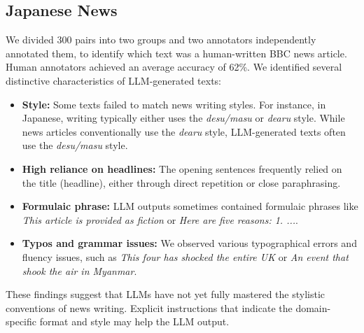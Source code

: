 \subsection{Japanese News}
\label{japanese_news_distinctive_clues}
We divided 300 pairs into two groups and two annotators independently annotated them, to identify which text was a human-written BBC news article.
Human annotators achieved an average accuracy of 62\%. %
We identified several distinctive characteristics of LLM-generated texts:
\begin{itemize}
    \item \textbf{Style:} Some texts failed to match news writing styles.
    For instance, in Japanese, writing typically either uses the \textit{desu/masu} or \textit{dearu} style.
    While news articles conventionally use the \textit{dearu} style, LLM-generated texts often use the \textit{desu/masu} style.
    \item \textbf{High reliance on headlines:} The opening sentences frequently relied on the title (headline), either through direct repetition or close paraphrasing.
    \item \textbf{Formulaic phrase:} LLM outputs sometimes contained formulaic phrases like \textit{This article is provided as fiction} or \textit{Here are five reasons: 1. ...}.
    \item \textbf{Typos and grammar issues:} We observed various typographical errors and fluency issues, such as \textit{This four has shocked the entire UK} or \textit{An event that shook the air in Myanmar}.
\end{itemize}
These findings suggest that LLMs have not yet fully mastered the stylistic conventions of news writing.
Explicit instructions that indicate the domain-specific format and style may help the LLM output.




